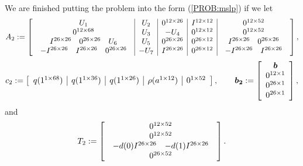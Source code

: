 We are finished putting the problem into the form (\ref{PROB:mslp}) if we let
\[
A_2:=\left[\begin{array}{c|c|c|c|c}
U_1 & U_2 & 0^{12\times 26} & I^{12\times 12} & 0^{12\times 52}\\
0^{12\times 68} & U_3 & -U_4 & 0^{12\times 12} & 0^{12\times 52}\\
\begin{array}{ccc} I^{26\times 26} & 0^{26\times 26} & U_6\end{array} & U_5 & 0^{26\times 26} & 0^{26\times 12} & \begin{array}{cc} I^{26\times 26} & 0^{26\times 26}\end{array}\\
\begin{array}{ccc} -I^{26\times 26} & I^{26\times 26} & 0^{26\times 26}\end{array} & -U_7 & I^{26\times 26} & 0^{26\times 12} & \begin{array}{cc} -I^{26\times 26} & I^{26\times 26}\end{array}
\end{array}\right],
\]
\[
c_2\assign\left[\begin{array}{c|c|c|c|c}
q(1^{1\times 68}) & q(1^{1\times 36}) & q(1^{1\times 26}) & \rho(a^{1\times 12}) & 0^{1\times 52}\end{array}\right],\qquad%
\rand{b_2}\assign\left[\ajfbox{\rand{b}\\ 0^{12\times 1}\\ 0^{26\times 1}\\ 0^{26\times 1}}\right],
\]
and
\[
T_2:=\left[\begin{array}{c}
0^{12\times 52}\\
0^{12\times 52}\\
\begin{array}{cc}
-d(0) I^{26\times 26} & -d(1) I^{26\times 26} \end{array}\\
0^{26\times 52}
\end{array}\right].
\]


